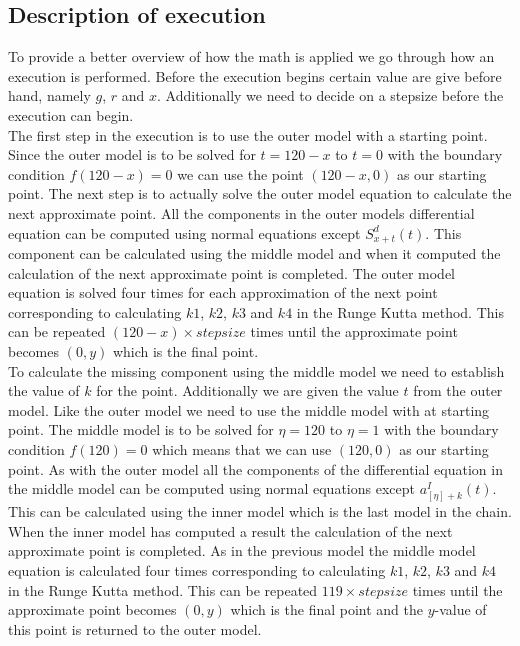 \subsection{Description of execution}
	To provide a better overview of how the math is applied we go through how an execution is performed. Before the execution begins certain value are give before hand, namely $g$, $r$ and $x$. Additionally we need to decide on a stepsize before the execution can begin. \\
	
	The first step in the execution is to use the outer model with a starting point. Since the outer model is to be solved for $t=120-x$ to $t=0$ with the boundary condition $f(120-x)=0$ we can use the point $(120-x, 0)$ as our starting point. The next step is to actually solve the outer model equation to calculate the next approximate point. All the components in the outer models differential equation can be computed using normal equations except $S_{x+t}^d (t)$. This component can be calculated using the middle model and when it computed the calculation of the next approximate point is completed. The outer model equation is solved four times for each approximation of the next point corresponding to calculating $k1$, $k2$, $k3$ and $k4$ in the Runge Kutta method. This can be repeated $(120-x) \times stepsize$ times until the approximate point becomes $(0,y)$ which is the final point. \\
	
	To calculate the missing component using the middle model we need to establish the value of $k$ for the point. Additionally we are given the value $t$ from the outer model. Like the outer model we need to use the middle model with at starting point. The middle model is to be solved for $\eta = 120$ to $\eta = 1$ with the boundary condition $f(120) = 0$ which means that we can use $(120,0)$ as our starting point. As with the outer model all the components of the differential equation in the middle model can be computed using normal equations except $a_{[\eta]+k}^I(t)$. This can be calculated using the inner model which is the last model in the chain. When the inner model has computed a result the calculation of the next approximate point is completed. As in the previous model the middle model equation is calculated four times corresponding to calculating $k1$, $k2$, $k3$ and $k4$ in the Runge Kutta method. This can be repeated $119 \times stepsize$ times until the approximate point becomes $(0,y)$ which is the final point and the $y$-value of this point is returned to the outer model. \\
	
